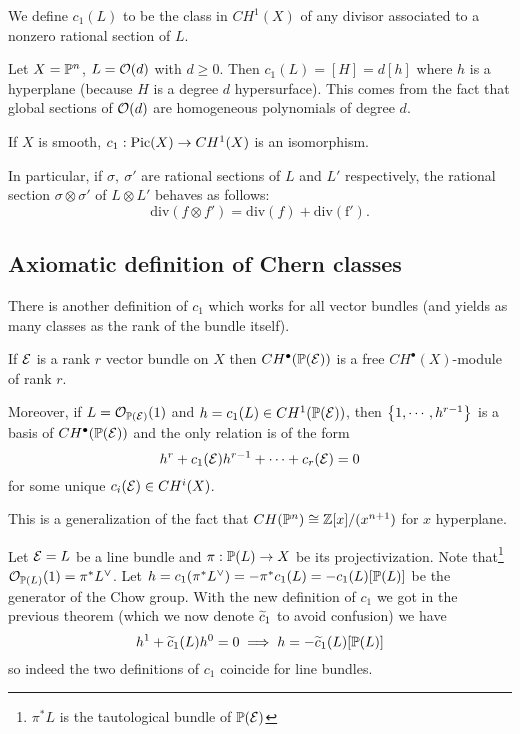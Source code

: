 \begin{definition}[]
We define $c_1(L)$ to be the class in $CH^1(X)$ of any divisor associated to a nonzero rational section of $L$.
\end{definition}

\begin{example}
Let $X=\mathbb{P}^n$, $L=\mathcal{O}(d)$ with $d\geq 0$. Then $c_1(L)=[H]=d[h]$ where $h$ is a hyperplane (because $H$ is a degree $d$ hypersurface). This comes from the fact that global sections of $\mathcal{O}(d)$ are homogeneous polynomials of degree $d$.
\end{example}

\begin{proposition}[]
If $X$ is smooth, $c_1:\operatorname{Pic}(X)\to CH^1(X)$ is an isomorphism. 

In particular, if $\sigma,\ \sigma'$ are rational sections of $L$ and $L'$ respectively, the rational section $\sigma\otimes \sigma'$ of $L\otimes L'$ behaves as follows: 
\[\mathrm{div}(f\otimes f')=\mathrm{div}(f)+\mathrm{div(f')}.\]
\end{proposition}


\subsection{Axiomatic definition of Chern classes}
There is another definition of $c_1$ which works for all vector bundles (and yields as many classes as the rank of the bundle itself). 

\begin{theorem}[]
If $\mathcal{E}$ is a rank $r$ vector bundle on $X$ then
$CH^\bullet(\mathbb{P}(\mathcal{E}))$ is a free $CH^\bullet(X)$-module of rank $r$. 

Moreover, if $L=\mathcal{O}_{\mathbb{P}(\mathcal{E})}(1)$ and $h=c_1(L)\in CH^1(\mathbb{P}(\mathcal{E}))$, then $\left\{{1,\cdots, h^{r-1}}\right\}$ is a basis of $CH^\bullet(\mathbb{P}(\mathcal{E}))$ and the only relation is of the form
\[h^r+c_1(\mathcal{E})h^{r-1}+\cdots+c_r(\mathcal{E})=0\]
for some unique $c_i(\mathcal{E})\in CH^i(X)$.
\end{theorem}

\begin{remark}
This is a generalization of the fact that $CH(\mathbb{P}^n)\cong \mathbb{Z}[x]/(x^{n+1})$ for $x$ hyperplane.
\end{remark}


\begin{example}
Let $\mathcal{E}=L$ be a line bundle and $\pi:\mathbb{P}(L)\to X$ be its projectivization. Note that\footnote{$\pi^\ast L$ is the tautological bundle of $\mathbb{P}(\mathcal{E})$} $\mathcal{O}_{\mathbb{P}(L)}(1)=\pi^\ast L^\vee$. 
Let $h=c_1(\pi^\ast L^\vee)=-\pi^\ast c_1(L)=-c_1(L)[\mathbb{P}(L)]$ be the generator of the Chow group. With the new definition of $c_1$ we got in the previous theorem (which we now denote $\widetilde{c}_1$ to avoid confusion) we have
\[h^1+\widetilde{c}_1(L)h^0=0\implies h=-\widetilde{c}_1(L)[\mathbb{P}(L)]\]
so indeed the two definitions of $c_1$ coincide for line bundles.
\end{example}



